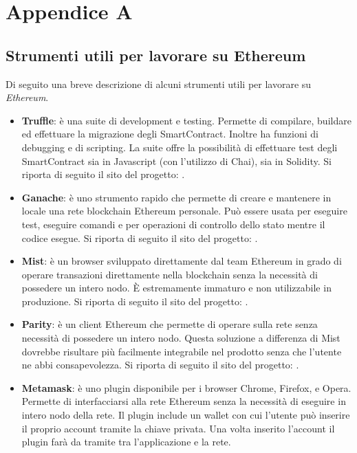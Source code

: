 
\chapter{Appendice A}
\section{Strumenti utili per lavorare su Ethereum}
\label{cap:str_eth}
Di seguito una breve descrizione di alcuni strumenti utili per lavorare su \emph{Ethereum}.
\begin{itemize}
    \item \textbf{Truffle}: è una suite di development e testing. Permette di compilare, buildare ed effettuare la migrazione degli SmartContract. Inoltre ha funzioni di debugging e di scripting. La suite offre la possibilità di effettuare test degli SmartContract sia in Javascript (con l’utilizzo di Chai), sia in Solidity. Si riporta di seguito il sito del progetto: \cite{site:truffle}.
    \item \textbf{Ganache}: è uno strumento rapido che permette di creare e mantenere in locale una rete blockchain Ethereum personale. Può essere usata per eseguire test, eseguire comandi e per operazioni di controllo dello stato mentre il codice esegue. Si riporta di seguito il sito del progetto: \cite{site:ganache}.
    \item \textbf{Mist}: è un browser sviluppato direttamente dal team Ethereum in grado di operare transazioni direttamente nella blockchain senza la necessità di possedere un intero nodo. È estremamente immaturo e non utilizzabile in produzione. Si riporta di seguito il sito del progetto: \cite{site:mist}.
    \item \textbf{Parity}: è un client Ethereum che permette di operare sulla rete senza necessità di possedere un intero nodo. Questa soluzione a differenza di Mist dovrebbe risultare più facilmente integrabile nel prodotto senza che l’utente ne abbi consapevolezza. Si riporta di seguito il sito del progetto: \cite{site:parity} .
    \item \textbf{Metamask}: è uno plugin disponibile per i browser Chrome, Firefox, e Opera. Permette di interfacciarsi alla rete Ethereum senza la necessità di eseguire in intero nodo della rete. Il plugin include un wallet con cui l’utente può inserire il proprio account tramite la chiave privata. Una volta inserito l’account il plugin farà da tramite tra l’applicazione e la rete.

\end{itemize}
